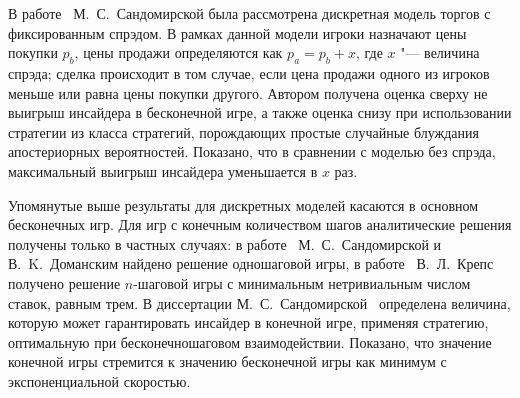В работе~\cite{sandomirskaya14} М.~С.~Сандомирской была рассмотрена дискретная модель торгов с фиксированным спрэдом.
В рамках данной модели игроки назначают цены покупки $p_b$, цены продажи определяются как $p_a = p_b + x$, где $x$ "--- величина спрэда; сделка происходит в том случае, если цена продажи одного из игроков меньше или равна цены покупки другого. 
Автором получена оценка сверху не выигрыш инсайдера в бесконечной игре, а также оценка снизу при использовании стратегии из класса стратегий, порождающих простые случайные блуждания апостериорных вероятностей. 
Показано, что в сравнении с моделью без спрэда, максимальный выигрыш инсайдера уменьшается в $x$ раз.

Упомянутые выше результаты для дискретных моделей касаются в основном бесконечных игр.
Для игр с конечным количеством шагов аналитические решения получены только в частных случаях: в работе~\cite{sandomirskaya12} М.~С.~Сандомирской и В.~K.~Доманским найдено решение одношаговой игры, в работе~\cite{kreps09} В.~Л.~Крепс получено решение $n$-шаговой игры с минимальным нетривиальным числом ставок, равным трем.
В диссертации М.~С.~Сандомирской~\cite{phd:sandomirskaya} определена величина, которую может гарантировать инсайдер в конечной игре, применяя стратегию, оптимальную при бесконечношаговом взаимодействии.
Показано, что значение конечной игры стремится к значению бесконечной игры как минимум с экспоненциальной скоростью.

